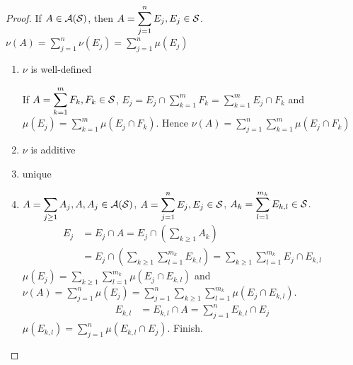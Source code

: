 \documentclass[11pt]{article}
\begin{document}
\begin{proof}
If \(A\in\mathcal{A}(\mathcal{S})\), then \(A=\displaystyle\sum_{j=1}^nE_j,E_j\in\mathcal{S}\).
\(\nu(A)=\displaystyle\sum_{j=1}^n\nu(E_j)=\displaystyle\sum_{j=1}^n\mu(E_j)\) 
\begin{enumerate}
\item \(\nu\) is well-defined

If \(A=\displaystyle\sum_{k=1}^mF_k,F_k\in\mathcal{S}\), \(E_j=E_j\cap
   \displaystyle\sum_{k=1}^mF_k=\displaystyle\sum_{k=1}^m E_j\cap F_k\) and
\(\mu(E_j)=\displaystyle\sum_{k=1}^m \mu(E_j\cap F_k)\). Hence
\(\nu(A)=\displaystyle\sum_{j=1}^n \displaystyle\sum_{k=1}^m\mu(E_j\cap F_k)\)
\item \(\nu\) is additive
\item unique
\item \(A=\displaystyle\sum_{j\ge 1}A_j,A,A_j\in\mathcal{A}(\mathcal{S})\),
\(A=\displaystyle\sum_{j=1}^nE_j,E_j\in\mathcal{S}\), 
\(A_k=\displaystyle\sum_{l=1}^{m_k}E_{k,l}\in\mathcal{S}\). 
\begin{align*}
E_j&=E_j\cap A
=E_j\cap(\displaystyle\sum_{k\ge 1}A_k)\\
&=E_j\cap
(\displaystyle\sum_{k\ge 1}\displaystyle\sum_{l=1}^{m_k}E_{k,l})
=\displaystyle\sum_{k\ge 1}\displaystyle\sum_{l=1}^{m_k}E_j\cap E_{k,l}
\end{align*}
\(\mu(E_j)=\displaystyle\sum_{k\ge1}\displaystyle\sum_{l=1}^{m_k}\mu(E_j\cap
   E_{k,l})\) and \(\nu(A)=\displaystyle\sum_{j=1}^n\mu(E_j)=
   \displaystyle\sum_{j=1}^n
   \displaystyle\sum_{k\ge 1}\displaystyle\sum_{l=1}^{m_k}\mu(E_j\cap E_{k,l})\).
\begin{align*}
E_{k,l}&=E_{k,l}\cap A=\displaystyle\sum_{j=1}^nE_{k,l}\cap E_j
\end{align*}
\(\mu(E_{k,l})=\displaystyle\sum_{j=1}^n\mu(E_{k,l}\cap E_j)\). Finish.
\end{enumerate}
\end{proof}
\end{document}
